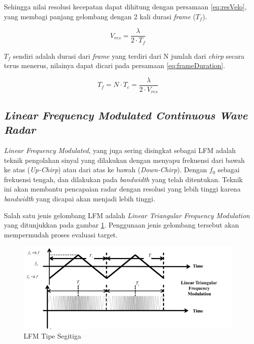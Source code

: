 Sehingga nilai resolusi kecepatan dapat dihitung dengan persamaan \ref{eq:resVelo}, yang membagi panjang gelombang dengan 2 kali durasi \textit{frame} ($T_{f}$).

\begin{equation}
	V_{res} = \frac{\lambda}{2 \cdot T_{f}}
	\label{eq:resVelo}
\end{equation}

$T_{f}$ sendiri adalah durasi dari \textit{frame} yang terdiri dari N jumlah dari \textit{chirp} secara terus menerus, nilainya dapat dicari pada persamaan \ref{eq:frameDuration}.

\begin{equation}
	T_{f} = N \cdot T_{c} = \frac{\lambda}{2 \cdot V_{res}}
	\label{eq:frameDuration}
\end{equation}

\subsection{\textit{Linear Frequency Modulated Continuous Wave Radar}}
\textit{Linear Frequency Modulated}, yang juga sering disingkat sebagai LFM adalah teknik pengolahan sinyal yang dilakukan dengan menyapu frekuensi dari bawah ke atas (\textit{Up-Chirp}) atau dari atas ke bawah (\textit{Down-Chirp}). Dengan $f_{0}$ sebagai frekuensi tengah, dan dilakukan pada \textit{bandwidth} yang telah ditentukan. Teknik ini akan membantu pencapaian radar dengan resolusi yang lebih tinggi karena \textit{bandwidth} yang dicapai akan menjadi lebih tinggi.

Salah satu jenis gelombang LFM adalah \textit{Linear Triangular Frequency Modulation} yang ditunjukkan pada gambar \ref{pic:LFMTriangular}. Penggunaan jenis gelombang tersebut akan mempermudah proses evaluasi target.

\begin{figure}
	\begin{center}
		\includegraphics[scale=0.7]{pics/bab2/lfmTriangular.png}
		\caption[LFM Tipe Segitiga]{LFM Tipe Segitiga \cite{Jankiraman2018}}
		\label{pic:LFMTriangular}
	\end{center}
\end{figure}


